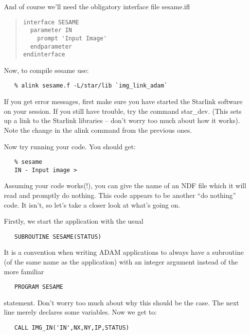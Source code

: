 And of course we'll need the obligatory interface file {\sf sesame.ifl}

\begin{quote}
{\small
\begin{verbatim}
interface SESAME
  parameter IN
    prompt 'Input Image'
  endparameter
endinterface 
\end{verbatim}       
}
\end{quote}

Now, to compile sesame use:

\begin{verbatim}
   % alink sesame.f -L/star/lib `img_link_adam`
\end{verbatim}

If you get error messages, first make sure you have started the Starlink
software on your session.  If you still have trouble, try the command {\sf
star\_dev}. (This sets up a link to the Starlink libraries -- don't worry too
much about how it works). Note the change in the {\sf alink} command from the
previous ones.

Now try running your code. You should get:

\begin{verbatim}
   % sesame
   IN - Input image >
\end{verbatim}

Assuming your code works(!), you can give the name of an NDF file which it
will read and promptly do nothing. This code appears to be another ``do
nothing'' code. It isn't, so let's take a closer look at what's going on.

Firstly, we start the application with the usual

\begin{verbatim}
   SUBROUTINE SESAME(STATUS)
\end{verbatim}

It is a convention when writing ADAM applications to always have 
a subroutine (of the same name as the application) with
an integer argument instead of the more familiar

\begin{verbatim}
   PROGRAM SESAME
\end{verbatim}

statement. Don't worry too much about why this should be the case. 
The next line merely declares some variables. Now 
we get to:

\begin{verbatim}
   CALL IMG_IN('IN',NX,NY,IP,STATUS)
\end{verbatim}

